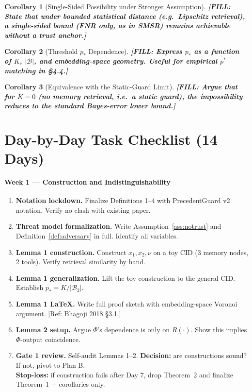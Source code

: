 \documentclass[11pt]{article}
\newcommand{\TODO}[1]{{\color{red}\textbf{[FILL: #1]}}}
\newcommand{\REF}[1]{{\color{teal}\textsf{[Ref: #1]}}}
\theoremstyle{plain}
\newtheorem{corollary}{Corollary}
\theoremstyle{definition}
\begin{document}
\begin{corollary}[Single-Sided Possibility under Stronger Assumption]\label{cor:single}
\TODO{State that under bounded statistical distance (e.g.\ Lipschitz retrieval),
a \emph{single-sided} bound (FNR only, as in SMSR) remains achievable without
a trust anchor.}
\end{corollary}

\begin{corollary}[Threshold $p_*$ Dependence]\label{cor:threshold}
\TODO{Express $p_*$ as a function of $K$, $|\mathcal{B}|$, and embedding-space
geometry. Useful for empirical $p^*$ matching in \S 4.4.}
\end{corollary}

\begin{corollary}[Equivalence with the Static-Guard Limit]\label{cor:static}
\TODO{Argue that for $K = 0$ (no memory retrieval, i.e.\ a static guard),
the impossibility reduces to the standard Bayes-error lower bound.}
\end{corollary}

\section{Day-by-Day Task Checklist (14 Days)}

\paragraph{Week 1 --- Construction and Indistinguishability}

\begin{enumerate}[label=\textbf{Day \arabic*.}, leftmargin=*]
  \item \textbf{Notation lockdown.} Finalize Definitions 1--4 with PrecedentGuard v2
        notation. Verify no clash with existing paper.
  \item \textbf{Threat model formalization.} Write Assumption~\ref{ass:notrust}
        and Definition~\ref{def:adversary} in full. Identify all variables.
  \item \textbf{Lemma 1 construction.} Construct $x_1, x_2, \nu$ on a toy CID
        (3 memory nodes, 2 tools). Verify retrieval similarity by hand.
  \item \textbf{Lemma 1 generalization.} Lift the toy construction to the
        general CID. Establish $p_* = K / |\mathcal{B}_2|$.
  \item \textbf{Lemma 1 LaTeX.} Write full proof sketch with embedding-space
        Voronoi argument. \REF{Bhagoji 2018 \S 3.1.}
  \item \textbf{Lemma 2 setup.} Argue $\Phi$'s dependence is only on $R(\cdot)$.
        Show this implies $\Phi$-output coincidence.
  \item \textbf{Gate 1 review.} Self-audit Lemmas 1--2.
        \textbf{Decision:} are constructions sound? If not, pivot to Plan B.
        \\\textbf{Stop-loss:} if construction fails after Day 7, drop Theorem~2 and finalize Theorem~1 + corollaries only.
\end{enumerate}
\end{document}
